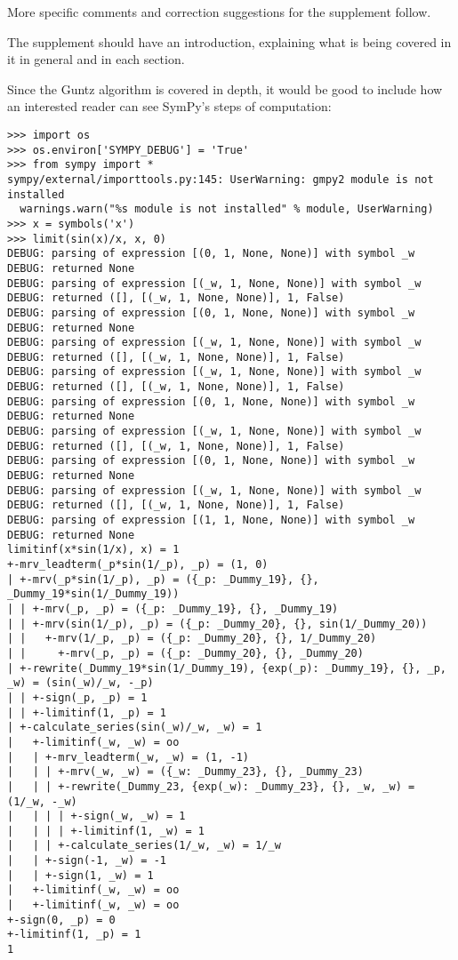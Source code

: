 \documentclass[answers,12pt]{exam}
\begin{document}
\begin{questions}
More specific comments and correction suggestions for the supplement follow.

\question The supplement should have an introduction, explaining what is being covered in it in general and in each section.
\begin{solution}

\end{solution}

\question Since the Guntz algorithm is covered in depth, it would be good to
include how an interested reader can see SymPy's steps of computation:

\begin{verbatim}
>>> import os
>>> os.environ['SYMPY_DEBUG'] = 'True'
>>> from sympy import *
sympy/external/importtools.py:145: UserWarning: gmpy2 module is not installed
  warnings.warn("%s module is not installed" % module, UserWarning)
>>> x = symbols('x')
>>> limit(sin(x)/x, x, 0)
DEBUG: parsing of expression [(0, 1, None, None)] with symbol _w
DEBUG: returned None
DEBUG: parsing of expression [(_w, 1, None, None)] with symbol _w
DEBUG: returned ([], [(_w, 1, None, None)], 1, False)
DEBUG: parsing of expression [(0, 1, None, None)] with symbol _w
DEBUG: returned None
DEBUG: parsing of expression [(_w, 1, None, None)] with symbol _w
DEBUG: returned ([], [(_w, 1, None, None)], 1, False)
DEBUG: parsing of expression [(_w, 1, None, None)] with symbol _w
DEBUG: returned ([], [(_w, 1, None, None)], 1, False)
DEBUG: parsing of expression [(0, 1, None, None)] with symbol _w
DEBUG: returned None
DEBUG: parsing of expression [(_w, 1, None, None)] with symbol _w
DEBUG: returned ([], [(_w, 1, None, None)], 1, False)
DEBUG: parsing of expression [(0, 1, None, None)] with symbol _w
DEBUG: returned None
DEBUG: parsing of expression [(_w, 1, None, None)] with symbol _w
DEBUG: returned ([], [(_w, 1, None, None)], 1, False)
DEBUG: parsing of expression [(1, 1, None, None)] with symbol _w
DEBUG: returned None
limitinf(x*sin(1/x), x) = 1
+-mrv_leadterm(_p*sin(1/_p), _p) = (1, 0)
| +-mrv(_p*sin(1/_p), _p) = ({_p: _Dummy_19}, {}, _Dummy_19*sin(1/_Dummy_19))
| | +-mrv(_p, _p) = ({_p: _Dummy_19}, {}, _Dummy_19)
| | +-mrv(sin(1/_p), _p) = ({_p: _Dummy_20}, {}, sin(1/_Dummy_20))
| |   +-mrv(1/_p, _p) = ({_p: _Dummy_20}, {}, 1/_Dummy_20)
| |     +-mrv(_p, _p) = ({_p: _Dummy_20}, {}, _Dummy_20)
| +-rewrite(_Dummy_19*sin(1/_Dummy_19), {exp(_p): _Dummy_19}, {}, _p, _w) = (sin(_w)/_w, -_p)
| | +-sign(_p, _p) = 1
| | +-limitinf(1, _p) = 1
| +-calculate_series(sin(_w)/_w, _w) = 1
|   +-limitinf(_w, _w) = oo
|   | +-mrv_leadterm(_w, _w) = (1, -1)
|   | | +-mrv(_w, _w) = ({_w: _Dummy_23}, {}, _Dummy_23)
|   | | +-rewrite(_Dummy_23, {exp(_w): _Dummy_23}, {}, _w, _w) = (1/_w, -_w)
|   | | | +-sign(_w, _w) = 1
|   | | | +-limitinf(1, _w) = 1
|   | | +-calculate_series(1/_w, _w) = 1/_w
|   | +-sign(-1, _w) = -1
|   | +-sign(1, _w) = 1
|   +-limitinf(_w, _w) = oo
|   +-limitinf(_w, _w) = oo
+-sign(0, _p) = 0
+-limitinf(1, _p) = 1
1
\end{verbatim}


\end{questions}
\end{document}
